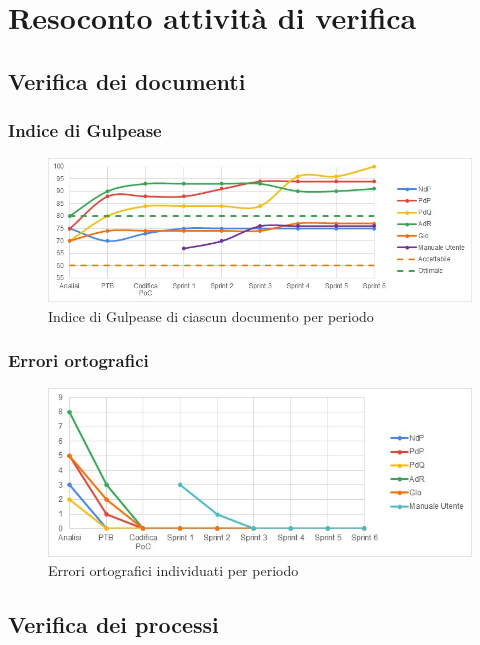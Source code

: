 \appendix
\section{Resoconto attività di verifica}\label{section:resoconto_verifica}
\subsection{Verifica dei documenti}\label{subsection:verifica_documenti}
\subsubsection{Indice di Gulpease}
\begin{figure}[H]
  \centering
  \includegraphics[scale=0.8]{immagini/gulpease.jpg}
  \caption{Indice di Gulpease di ciascun documento per periodo}
\end{figure}

\subsubsection{Errori ortografici}
\begin{figure}[H]
  \centering
  \includegraphics[scale=0.8]{immagini/err_ortografici.jpg}
  \caption{Errori ortografici individuati per periodo}
\end{figure}


\subsection{Verifica dei processi}\label{subsection:verifica_processi}
